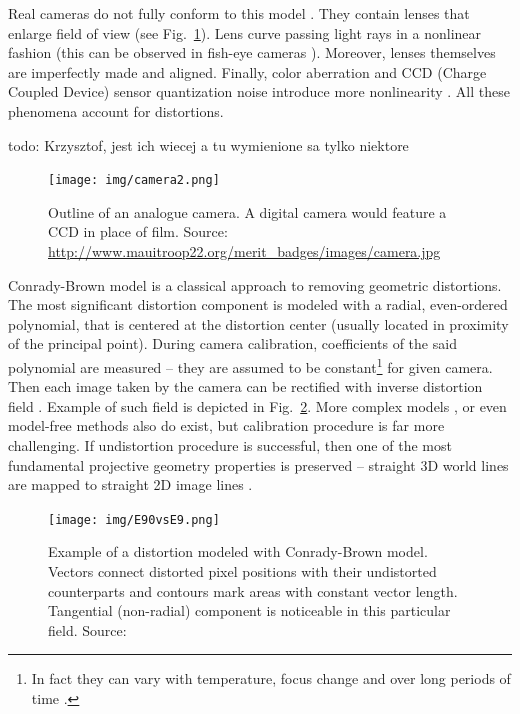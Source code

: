 Real cameras do not fully conform to this model \cite{szczesny}. They contain lenses that enlarge field of view (see Fig.~\ref{fig:analogue}). Lens curve passing light rays in a nonlinear fashion (this can be observed in fish-eye cameras \cite{fisheye_endoscopy}). Moreover, lenses themselves are imperfectly made and aligned. Finally, color aberration and CCD (Charge Coupled Device) sensor quantization noise introduce more nonlinearity \cite{heikkla14}. All these phenomena account for distortions.

todo: Krzysztof, jest ich wiecej a tu wymienione sa tylko niektore

\begin{figure}[ht]
	\centering\texttt{[image: img/camera2.png]}
	\caption{Outline of an analogue camera. A digital camera would feature a CCD in place of film. Source: \url{ http://www.mauitroop22.org/merit_badges/images/camera.jpg} }
	\label{fig:analogue}
\end{figure}

Conrady-Brown model \cite{brown8} \cite{Zhang_flexible} is a classical approach to removing geometric distortions. The most significant distortion component is modeled with a radial, even-ordered polynomial, that is centered at the distortion center (usually located in proximity of the principal point). During camera calibration, coefficients of the said polynomial are measured -- they are assumed to be constant\footnote{In fact they can vary with temperature, focus change and over long periods of time \cite{google_calibration}.} for given camera. Then each image taken by the camera can be rectified with inverse distortion field \cite{opencv}. Example of such field is depicted in Fig.~\ref{fig:brown}. More complex models \cite{simultaneous}, or even model-free methods \cite{towards} \cite{parameterfree} also do exist, but calibration procedure is far more challenging. If undistortion procedure is successful, then one of the most fundamental projective geometry properties is preserved -- straight 3D world lines are mapped to straight 2D image lines \cite{straight}.

\begin{figure}[ht]
	\centering\texttt{[image: img/E90vsE9.png]}
	\caption{Example of a distortion modeled with Conrady-Brown model. Vectors connect distorted pixel positions with their undistorted counterparts and contours mark areas with constant vector length. Tangential (non-radial) component is noticeable in this particular field. Source: \cite{szczesny} }
	\label{fig:brown}
\end{figure}


